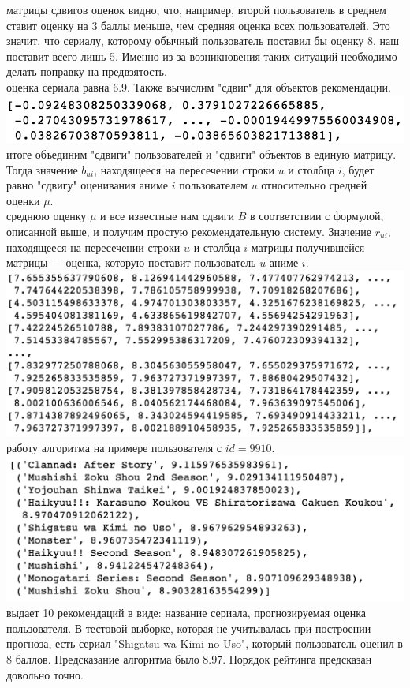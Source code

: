 \documentclass{article}
\newcommand\tab[1][1cm]{\hspace*{#1}}
\begin{document}
 матрицы сдвигов оценок видно, что, например, второй пользователь в среднем ставит оценку на 3 баллы меньше, чем средняя оценка всех пользователей. Это значит, что сериалу, которому обычный пользователь поставил бы оценку 8, наш поставит всего лишь 5. Именно из-за возникновения таких ситуаций необходимо делать поправку на предвзятость.\\
 оценка сериала равна $6.9$. Также вычислим "сдвиг" для объектов рекомендации.\\
\includegraphics[scale=0.8]{f13.png}\\
 итоге объединим "сдвиги" пользователей и "сдвиги" объектов в единую матрицу. Тогда значение $b_{ui}$, находящееся на пересечении строки $u$ и столбца $i$, будет равно "сдвигу" оценивания аниме $i$ пользователем $u$ относительно средней оценки $\mu$.\\
 среднюю оценку $\mu$ и все известные нам сдвиги $B$ в соответствии с формулой, описанной выше, и получим простую рекомендательную систему. Значение $r_{ui}$, находящееся на пересечении строки $u$ и столбца $i$ матрицы получившейся матрицы — оценка, которую поставит пользователь $u$ аниме $i$.\\
\includegraphics[scale=0.8]{f14.png}\\
 работу алгоритма на примере пользователя с $id=9910$.\\
\includegraphics[scale=0.8]{f15.png}\\
 выдает 10 рекомендаций в виде: название сериала, прогнозируемая оценка пользователя. В тестовой выборке, которая не учитывалась при построении прогноза, есть сериал "Shigatsu wa Kimi no Uso", который пользователь оценил в $8$ баллов. Предсказание алгоритма было $8.97$. Порядок рейтинга предсказан довольно точно.
\end{document}
